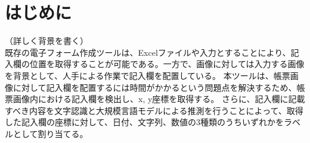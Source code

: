 \chapter{はじめに}\label{cha:Introduction}
（詳しく背景を書く）\\
既存の電子フォーム作成ツールは、Excelファイルや入力とすることにより、記入欄の位置を取得することが可能である。一方で、画像に対しては入力する画像を背景として、人手による作業で記入欄を配置している。
本ツールは、帳票画像に対して記入欄を配置するには時間がかかるという問題点を解決するため、帳票画像内における記入欄を検出し、x, y座標を取得する。
さらに、記入欄に記載すべき内容を文字認識と大規模言語モデルによる推測を行うことによって、取得した記入欄の座標に対して、日付、文字列、数値の3種類のうちいずれかをラベルとして割り当てる。

